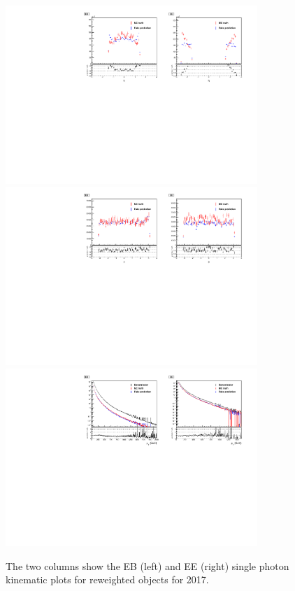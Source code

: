 \begin{figure}[!htbp]
\caption{The two columns show the EB (left) and EE (right) single photon kinematic plots for reweighted objects for 2017.}
\centering
\includegraphics[width=0.85\textwidth]{fig/closure_test_photon_kinematics_eta_2017sans_Denom.pdf}\\
\includegraphics[width=0.85\textwidth]{fig/closure_test_photon_kinematics_phi_2017sans_Denom.pdf}\\
\includegraphics[width=0.85\textwidth]{fig/closure_test_photon_kinematics_pt_2017.pdf}
\label{fig:kinematics17}
\end{figure}


